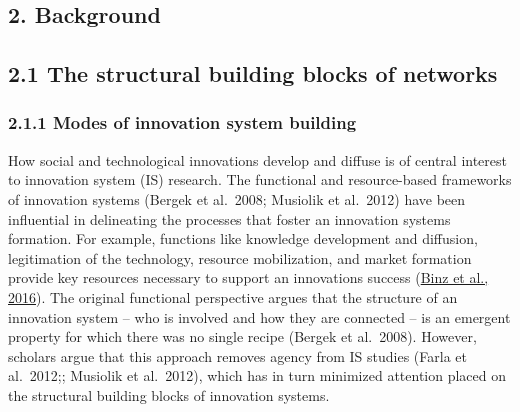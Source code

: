 \documentclass[twoside,12pt,final]{ucthesis-CA2012}
\begin{document}
\begin{ucmainmatter}
\hypertarget{background-2}{%
\section{2. Background}\label{background-2}}

\hypertarget{the-structural-building-blocks-of-networks}{%
\subsection{2.1 The structural building blocks of networks}\label{the-structural-building-blocks-of-networks}}

\hypertarget{modes-of-innovation-system-building}{%
\subsubsection{2.1.1 Modes of innovation system building}\label{modes-of-innovation-system-building}}

How social and technological innovations develop and diffuse is of
central interest to innovation system (IS) research. The functional and
resource-based frameworks of innovation systems (Bergek et al.~2008;
Musiolik et al.~2012) have been influential in delineating the processes
that foster an innovation system\textquotesingle s formation. For example, functions
like knowledge development and diffusion, legitimation of the
technology, resource mobilization, and market formation provide key
resources necessary to support an innovation\textquotesingle s success (\href{https://www.zotero.org/google-docs/?Sy7y1y}{Binz et al.,
2016}). The original
functional perspective argues that the structure of an innovation system
-- who is involved and how they are connected -- is an emergent property
for which there was no single recipe (Bergek et al.~2008). However,
scholars argue that this approach removes agency from IS studies (Farla
et al.~2012;; Musiolik et al.~2012), which has in turn minimized
attention placed on the structural building blocks of innovation
systems.


\end{ucmainmatter}
\end{document}
